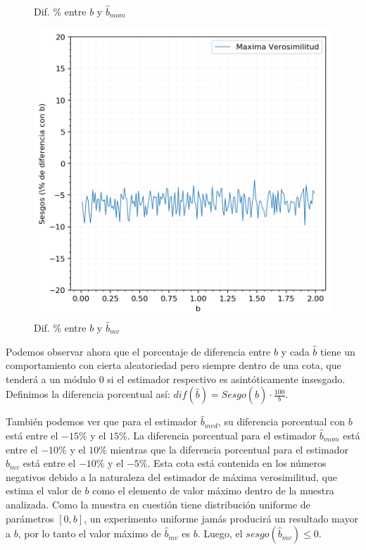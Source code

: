 \begin{figure}[H]
\begin{minipage}[t]{.325\textwidth}
		\caption{\footnotesize Dif. \% entre $b$ y $\hat{b}_{mom}$}
		\label{fig:ej6-sesgos-err-mom}
	\end{minipage}
	\begin{minipage}[t]{.325\textwidth}
		\centering
		\includegraphics[scale=0.37]{imagenes/sesgos-mv-porcentaje-err.png}
		\caption{\footnotesize Dif. \% entre $b$ y $\hat{b}_{mv}$}
		\label{fig:ej6-sesgos-err-mv}
	\end{minipage}
\end{figure}

Podemos observar ahora que el porcentaje de diferencia entre $b$ y cada $\hat{b}$ tiene un comportamiento con cierta aleatoriedad pero siempre dentro de una cota, que tenderá a un módulo $0$ si el estimador respectivo es asintóticamente insesgado. Definimos la diferencia porcentual así: $dif(\hat{b}) = Sesgo(\hat{b}) \cdot \frac{100}{b}$.

\vskip 8pt

También podemos ver que para el estimador $\hat{b}_{med}$, su diferencia porcentual con $b$ está entre el $-15\%$ y el $15\%$. La diferencia porcentual para el estimador $\hat{b}_{mom}$ está entre el $-10\%$ y el $10\%$ mientras que la diferencia porcentual para el estimador $\hat{b}_{mv}$ está entre el $-10\%$ y el $-5\%$. Esta cota está contenida en los números negativos debido a la naturaleza del estimador de máxima verosimilitud, que estima el valor de $b$ como el elemento de valor máximo dentro de la muestra analizada. Como la muestra en cuestión tiene distribución uniforme de parámetros $[0, b]$, un experimento uniforme jamás producirá un resultado mayor a $b$, por lo tanto el valor máximo de $\hat{b}_{mv}$ es $b$. Luego, el $sesgo(\hat{b}_{mv}) \leq 0$.


